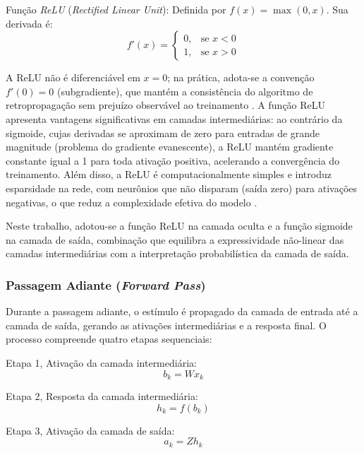 Função \textit{ReLU} (\textit{Rectified Linear Unit}): Definida por $f(x) = \max(0, x)$. Sua derivada é:
\begin{equation}
f'(x) = \begin{cases} 0, & \text{se } x < 0 \\ 1, & \text{se } x > 0 \end{cases}
\end{equation}

A ReLU não é diferenciável em $x = 0$; na prática, adota-se a convenção $f'(0) = 0$ (subgradiente), que mantém a consistência do algoritmo de retropropagação sem prejuízo observável ao treinamento \cite{braga2007}. A função ReLU apresenta vantagens significativas em camadas intermediárias: ao contrário da sigmoide, cujas derivadas se aproximam de zero para entradas de grande magnitude (problema do gradiente evanescente), a ReLU mantém gradiente constante igual a 1 para toda ativação positiva, acelerando a convergência do treinamento. Além disso, a ReLU é computacionalmente simples e introduz esparsidade na rede, com neurônios que não disparam (saída zero) para ativações negativas, o que reduz a complexidade efetiva do modelo \cite{dsa2022}.

Neste trabalho, adotou-se a função ReLU na camada oculta e a função sigmoide na camada de saída, combinação que equilibra a expressividade não-linear das camadas intermediárias com a interpretação probabilística da camada de saída.

\subsubsection{Passagem Adiante (\textit{Forward Pass})}

Durante a passagem adiante, o estímulo é propagado da camada de entrada até a camada de saída, gerando as ativações intermediárias e a resposta final. O processo compreende quatro etapas sequenciais:

Etapa 1, Ativação da camada intermediária:
\begin{equation}
b_k = W x_k
\end{equation}

Etapa 2, Resposta da camada intermediária:
\begin{equation}
h_k = f(b_k)
\end{equation}

Etapa 3, Ativação da camada de saída:
\begin{equation}
a_k = Z h_k
\end{equation}

